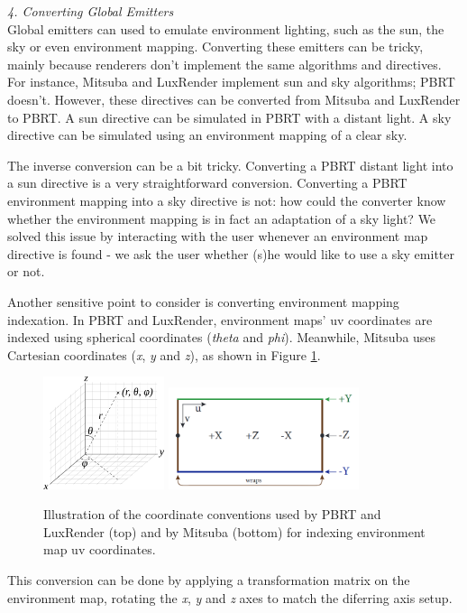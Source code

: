 
\textit{4. Converting Global Emitters} \\
Global emitters can used to emulate environment lighting, such as the sun, the
sky or even environment mapping. Converting these emitters can be tricky, mainly
because renderers don't implement the same algorithms and directives. For
instance, Mitsuba and LuxRender implement sun and sky algorithms; PBRT doesn't.
However, these directives can be converted from Mitsuba and LuxRender to PBRT. A
sun directive can be simulated in PBRT with a distant light. A sky directive can
be simulated using an environment mapping of a clear sky.

The inverse conversion can be a bit tricky. Converting a PBRT distant light into
a sun directive is a very straightforward conversion. Converting a PBRT
environment mapping into a sky directive is not: how could the converter know
whether the environment mapping is in fact an adaptation of a sky light? We
solved this issue by interacting with the user whenever an environment map
directive is found - we ask the user whether (s)he would like to use a sky
emitter or not.

Another sensitive point to consider is converting environment mapping 
indexation. In PBRT and LuxRender, environment maps' uv coordinates are indexed 
using spherical coordinates (\textit{theta} and \textit{phi}). Meanwhile, 
Mitsuba uses Cartesian coordinates (\textit{x}, \textit{y} and \textit{z}), as 
shown in Figure \ref{fig:mitdocemitter}. 

\begin{figure}[h]
\centering
\includegraphics[width=1.4in]{figs/3_system_architecture/spherical_coordinates.png}
\includegraphics[width=2.2in]{figs/3_system_architecture/mitdocemitter.png}
\caption{Illustration of the coordinate conventions used by PBRT and LuxRender 
(top) and by Mitsuba (bottom) for indexing environment map uv coordinates.}
\label{fig:mitdocemitter}
\end{figure}

This conversion can be done by applying a transformation matrix on the 
environment map, rotating the \textit{x}, \textit{y} and \textit{z} axes to match the diferring axis setup. 
